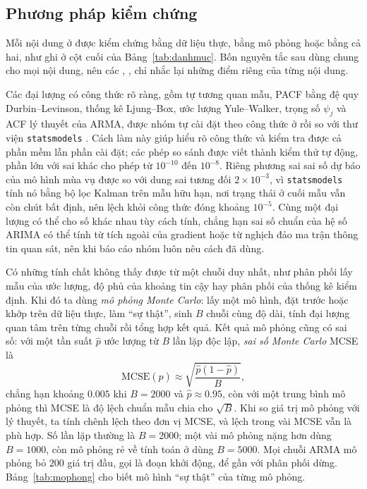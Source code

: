 

\subsection{Phương pháp kiểm chứng}

Mỗi nội dung ở  được kiểm chứng bằng dữ liệu thực, bằng mô phỏng hoặc bằng cả hai, như ghi ở cột cuối của Bảng~\ref{tab:danhmuc}. Bốn nguyên tắc sau dùng chung cho mọi nội dung, nên các , ,  chỉ nhắc lại những điểm riêng của từng nội dung.

Các đại lượng có công thức rõ ràng, gồm tự tương quan mẫu, PACF bằng đệ quy Durbin--Levinson, thống kê Ljung--Box, ước lượng Yule--Walker, trọng số $\psi_j$ và ACF lý thuyết của ARMA, được nhóm tự cài đặt theo công thức ở  rồi so với thư viện \texttt{statsmodels} . Cách làm này giúp hiểu rõ công thức và kiểm tra được cả phần mềm lẫn phần cài đặt; các phép so sánh được viết thành kiểm thử tự động, phần lớn với sai khác cho phép từ $10^{-10}$ đến $10^{-8}$. Riêng phương sai sai số dự báo của mô hình mùa vụ được so với dung sai tương đối $2\times10^{-3}$, vì \texttt{statsmodels} tính nó bằng bộ lọc Kalman trên mẫu hữu hạn, nơi trạng thái ở cuối mẫu vẫn còn chút bất định, nên lệch khỏi công thức đóng khoảng $10^{-5}$. Cùng một đại lượng có thể cho số khác nhau tùy cách tính, chẳng hạn sai số chuẩn của hệ số ARIMA có thể tính từ tích ngoài của gradient hoặc từ nghịch đảo ma trận thông tin quan sát, nên khi báo cáo nhóm luôn nêu cách đã dùng.

Có những tính chất không thấy được từ một chuỗi duy nhất, như phân phối lấy mẫu của ước lượng, độ phủ của khoảng tin cậy hay phân phối của thống kê kiểm định. Khi đó ta dùng \emph{mô phỏng Monte Carlo}: lấy một mô hình, đặt trước hoặc khớp trên dữ liệu thực, làm ``sự thật'', sinh $B$ chuỗi cùng độ dài, tính đại lượng quan tâm trên từng chuỗi rồi tổng hợp kết quả. Kết quả mô phỏng cũng có sai số: với một tần suất $\hat p$ ước lượng từ $B$ lần lặp độc lập, \emph{sai số Monte Carlo} MCSE là
\[
\mathrm{MCSE}(\hat p)\approx\sqrt{\frac{\hat p(1-\hat p)}{B}},
\]
chẳng hạn khoảng $0.005$ khi $B=2000$ và $\hat p\approx0.95$, còn với một trung bình mô phỏng thì MCSE là độ lệch chuẩn mẫu chia cho $\sqrt B$. Khi so giá trị mô phỏng với lý thuyết, ta tính chênh lệch theo đơn vị MCSE, và lệch trong vài MCSE vẫn là phù hợp. Số lần lặp thường là $B=2000$; một vài mô phỏng nặng hơn dùng $B=1000$, còn mô phỏng rẻ về tính toán ở  dùng $B=5000$. Mọi chuỗi ARMA mô phỏng bỏ $200$ giá trị đầu, gọi là đoạn khởi động, để gần với phân phối dừng. Bảng~\ref{tab:mophong} cho biết mô hình ``sự thật'' của từng mô phỏng.

